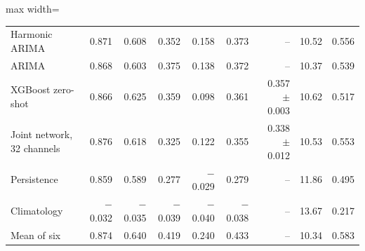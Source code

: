\begin{table}[tbp]
\begin{adjustbox}{max width=\textwidth}
\begin{tabular}{lrrrrrrrr}
Harmonic ARIMA & 0.871 & 0.608 & 0.352 & 0.158 & 0.373 & -- & 10.52 & 0.556 \\
ARIMA & 0.868 & 0.603 & 0.375 & 0.138 & 0.372 & -- & 10.37 & 0.539 \\
XGBoost zero-shot & 0.866 & 0.625 & 0.359 & 0.098 & 0.361 & 0.357 $\pm$ 0.003 & 10.62 & 0.517 \\
Joint network, 32 channels & 0.876 & 0.618 & 0.325 & 0.122 & 0.355 & 0.338 $\pm$ 0.012 & 10.53 & 0.553 \\
Persistence & 0.859 & 0.589 & 0.277 & $-$0.029 & 0.279 & -- & 11.86 & 0.495 \\
Climatology & $-$0.032 & $-$0.035 & $-$0.039 & $-$0.040 & $-$0.038 & -- & 13.67 & 0.217 \\
\midrule
Mean of six & 0.874 & 0.640 & 0.419 & 0.240 & 0.433 & -- & 10.34 & 0.583 \\
\bottomrule
\end{tabular}
\end{adjustbox}
\end{table}
